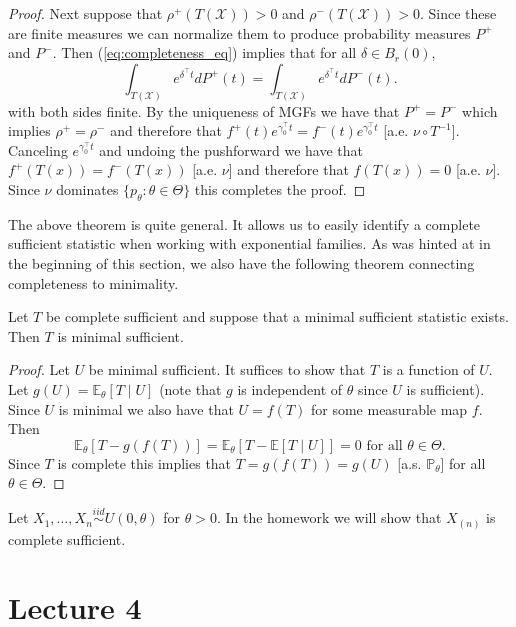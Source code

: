 \begin{proof}
	\medskip \noindent 
	Next suppose that $\rho^+(T(\mathcal X)) > 0$ and $\rho^-(T(\mathcal X)) > 0$. Since these are finite measures we can normalize them to produce probability measures $P^+$ and $P^-$. Then (\ref{eq:completeness_eq}) implies that for all $\delta \in B_r(0)$, \[
	\int_{T(\mathcal X)} e^{\delta^\top t} dP^+(t) = 	\int_{T(\mathcal X)} e^{\delta^\top t} dP^-(t).
	\] with both sides finite. By the uniqueness of MGFs we have that $P^+ = P^-$ which implies $\rho^+ = \rho^-$ and therefore that $
		f^+(t) e^{\gamma_0^\top t} = f^-(t) e^{\gamma_0^\top t} 
	$ [a.e. $\nu \circ T^{-1}$]. Canceling $e^{\gamma_0^\top t}$ and undoing the pushforward we have that $f^+(T(x)) = f^-(T(x))$ [a.e. $\nu$] and therefore that $f(T(x)) = 0$ [a.e. $\nu$]. Since $\nu$ dominates  $\{p_\theta : \theta \in \Theta \}$ this completes the proof.
\end{proof}

\noindent The above theorem is quite general. It allows us to easily identify a complete sufficient statistic when working with exponential families. As was hinted at in the beginning of this section, we also have the following theorem connecting completeness to minimality.

\begin{theorem}
	Let $T$ be complete sufficient and suppose that a minimal sufficient statistic exists. Then $T$ is minimal sufficient. 
\end{theorem}

\begin{proof}
Let $U$ be minimal sufficient. It suffices to show that $T$ is a function of $U$. Let $g(U) = \mathbb E_\theta[T \mid U]$ (note that $g$ is independent of $\theta$ since $U$ is sufficient). Since $U$ is minimal we also have that $U = f(T)$ for some measurable map $f$.  Then \[
	\mathbb E_\theta[T - g(f(T))] = \mathbb E_\theta[T - \mathbb E[T \mid U]] = 0 \text{ for all } \theta \in \Theta.
\]  Since $T$ is complete this implies that $T = g(f(T)) = g(U)$ [a.s. $\mathbb P_\theta$] for all $\theta \in \Theta$. 
\end{proof}

\begin{example}
	Let $X_1, \dots, X_n \overset{iid}{\sim} U(0, \theta)$ for $\theta > 0$. In the homework we will show that $X_{(n)}$ is complete sufficient.
\end{example}

\newpage
\section{Lecture 4}

